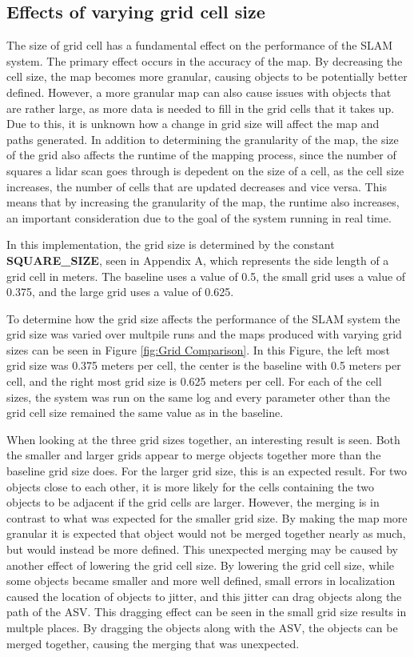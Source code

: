 \documentclass[10pt]{IEEEtran}
\begin{document}
\subsection{Effects of varying grid cell size}
The size of grid cell has a fundamental effect on the performance of the SLAM system.
The primary effect occurs in the accuracy of the map.  By decreasing the cell size,
the map becomes more granular, causing objects to be potentially better defined.  However,
a more granular map can also cause issues with objects that are rather large, as more
data is needed to fill in the grid cells that it takes up.  Due to this, it is unknown
how a change in grid size will affect the map and paths generated.  
In addition to determining the granularity of the map, the size of the grid also affects
the runtime of the mapping process, since the number of squares a lidar scan goes through
is depedent on the size of a cell, as the cell size increases, the number of cells that
are updated decreases and vice versa.  This means that by increasing the granularity of the
map, the runtime also increases, an important consideration due to the goal of the system
running in real time.  

In this implementation, the grid size is determined by the constant \textbf{SQUARE\_SIZE},
seen in Appendix A, which represents the side length of a grid cell in meters. 
The baseline uses a value of 0.5, the small grid uses a value of 0.375, and the large
grid uses a value of 0.625.

To determine how the grid size affects the performance of the SLAM system the grid size
was varied over multpile runs and the maps produced with varying grid sizes can be seen
in Figure \ref{fig:Grid Comparison}.  In this Figure, the left most grid size was 0.375
meters per cell, the center is the baseline with 0.5 meters per cell, and the right most
grid size is 0.625 meters per cell.  For each of the cell sizes, the system was run
on the same log and every parameter other than the grid cell size remained the same value
as in the baseline.

When looking at the three grid sizes together, an interesting result is seen.  Both the
smaller and larger grids appear to merge objects together more than the baseline grid size
does.  For the larger grid size, this is an expected result.  For two objects close to each
other, it is more likely for the cells containing the two objects to be adjacent if the grid
cells are larger.  However, 
the merging is in contrast to what was expected for the smaller grid size.  By making the 
map more granular it is expected that object would not be merged together nearly as much, 
but would instead be more defined.  This unexpected merging may be caused by another effect
of lowering the grid cell size.  By lowering the grid cell size, while some objects became
smaller and more well defined, small errors in localization caused the location of objects
to jitter, and this jitter can drag objects along the path of the ASV.  This dragging
effect can be seen in the small grid size results in multple places.  By dragging the 
objects along with the ASV, the objects can be merged together, causing the merging
that was unexpected.
\end{document}
